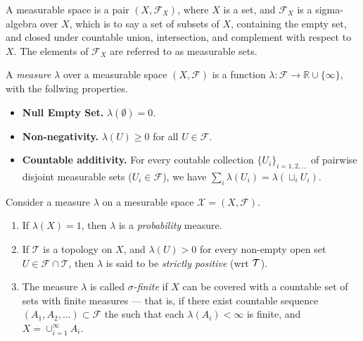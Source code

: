 \begin{defn}
    A measurable space is a pair $(X, \mathcal F_X)$, where $X$ is a set, and   $\mathcal F_X$ is a sigma-algebra over $X$, which is to say a set of subsets of $X$, containing the empty set, and closed under countable union, intersection, and complement with respect to $X$.
    The elements of $\mathcal F_X$ are referred to as measurable sets.
\end{defn}

\begin{defn}[Measure]
    A \emph{measure} $\lambda$ over a measurable space $(X, \mathcal F)$ is a function $\lambda : \mathcal F \to \mathbb R \cup \{\infty\}$, with the follwing properties.
    \begin{itemize}[itemsep=0pt]
        \item \textbf{Null Empty Set.} $\lambda(\emptyset) = 0$.
        \item \textbf{Non-negativity.} $\lambda(U) \ge 0$ for all $U \in \mathcal F$.
        \item \textbf{Countable additivity.} 
            For every coutable collection 
            $\{U_i\}_{i=1, 2, \ldots}$
            of pairwise disjoint measurable sets ($U_i \in \mathcal F$), we have
            $\sum_{i} \lambda(U_i) = \lambda(\sqcup_i U_i)$.
    \end{itemize}
\end{defn}

\begin{defn}
    Consider a measure $\lambda$ on a mesurable space $\mathcal X = (X, \mathcal F)$.
    \begin{enumerate}
        \item If $\lambda(X) = 1$, then $\lambda$ is a \emph{probability} measure. 
        \item If $\mathcal T$ is a topology on $X$, and 
            $\lambda(U) > 0$ for every non-empty open set $U \in \mathcal F \cap \mathcal T$, then $\lambda$ is said to be \emph{strictly positive} (wrt $\cal T$).
        \item The measure $\lambda$ is called \emph{$\sigma$-finite} if $X$ can be
        covered with a countable set of sets with finite measures --- that is, if
        there exist countable sequence $(A_1, A_2, \ldots ) \subset \mathcal F$ the
        such that each $\lambda(A_i) < \infty$ is finite, and $X = \cup_{i=1}^{\infty}
        A_i$.
        \qedhere
    \end{enumerate}
\end{defn}

